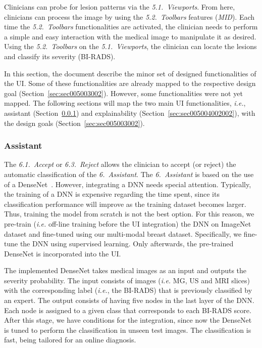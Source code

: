 Clinicians can probe for lesion patterns via the {\it 5.1.~Viewports}.
From here, clinicians can process the image by using the {\it 5.2.~Toolbars} features ({\it MID}).
Each time the {\it 5.2.~Toolbars} functionalities are activated, the clinician needs to perform a simple and easy interaction with the medical image to manipulate it as desired.
Using the {\it 5.2.~Toolbars} on the {\it 5.1.~Viewports}, the clinician can locate the lesions and classify its severity (\ac{BI-RADS}).

In this section, the document describe the minor set of designed functionalities of the \ac{UI}.
Some of these functionalities are already mapped to the respective design goal (Section~\ref{sec:sec005003002}).
However, some functionalities were not yet mapped.
The following sections will map the two main \ac{UI} functionalities, {\it i.e.}, assistant (Section~\ref{sec:sec005004002001}) and explainability (Section~\ref{sec:sec005004002002}), with the design goals (Section~\ref{sec:sec005003002}).

\subsubsection{Assistant}
\label{sec:sec005004002001}

The {\it 6.1.~Accept} or {\it 6.3.~Reject} allows the clinician to accept (or reject) the automatic classification of the {\it 6.~Assistant}.
The {\it 6.~Assistant} is based on the use of a DenseNet~\cite{Huang_2017_CVPR}.
However, integrating a \ac{DNN} needs special attention.
Typically, the training of a \ac{DNN} is expensive regarding the time spent, since its classification performance will improve as the training dataset becomes larger.
Thus, training the model from scratch is not the best option.
For this reason, we pre-train ({\it i.e.} off-line training before the \ac{UI} integration) the \ac{DNN} on ImageNet~\cite{10.1145/3351095.3375709} dataset and fine-tuned using our multi-modal breast dataset.
Specifically, we fine-tune the \ac{DNN} using supervised learning.
Only afterwards, the pre-trained DenseNet is incorporated into the \ac{UI}.

The implemented DenseNet takes medical images as an input and outputs the severity probability.
The input consists of images ({\it i.e.} \ac{MG}, \ac{US} and \ac{MRI} slices) with the corresponding label ({\it i.e.}, the \ac{BI-RADS}) that is previously classified by an expert.
The output consists of having five nodes in the last layer of the \ac{DNN}.
Each node is assigned to a given class that corresponds to each \ac{BI-RADS} score.
After this stage, we have conditions for the integration, since now the DenseNet is tuned to perform the classification in unseen test images.
The classification is fast, being tailored for an online diagnosis.

